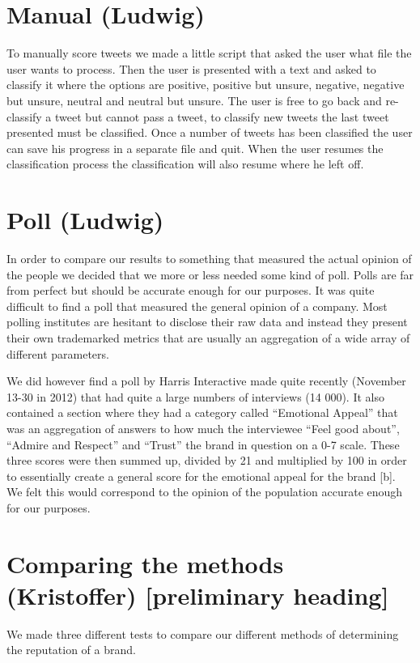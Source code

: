 \documentclass[a4paper,12pt]{report}
\begin{document}
\section{Manual (Ludwig)}
To manually score tweets we made a little script that asked the user what file the user wants to process. 
Then the user is presented with a text and asked to classify it where the options are positive, positive but unsure, negative, negative but unsure, neutral and neutral but unsure. 
The user is free to go back and re-classify a tweet but cannot pass a tweet, to classify new tweets the last tweet presented must be classified. 
Once a number of tweets has been classified the user can save his progress in a separate file and quit. 
When the user resumes the classification process the classification will also resume where he left off.

\section{Poll (Ludwig)}
In order to compare our results to something that measured the actual opinion of the people we decided that we more or less needed some kind of poll. 
Polls are far from perfect but should be accurate enough for our purposes. It was quite difficult to find a poll that measured the general opinion of a company. 
Most polling institutes are hesitant to disclose their raw data and instead they present their own trademarked metrics that are usually an aggregation of a wide array of different parameters.

We did however find a poll by Harris Interactive made quite recently (November 13-30 in 2012) that had quite a large numbers of interviews (14 000). 
It also contained a section where they had a category called “Emotional Appeal” that was an aggregation of answers to how much the interviewee “Feel good about”, “Admire and Respect” and “Trust” the brand in question on a 0-7 scale. 
These three scores were then summed up, divided by 21 and multiplied by 100 in order to essentially create a general score for the emotional appeal for the brand [b]. 
We felt this would correspond to the opinion of the population accurate enough for our purposes.

\section{Comparing the methods (Kristoffer) [preliminary heading]}
We made three different tests to compare our different methods of determining the reputation of a brand.
\end{document}
